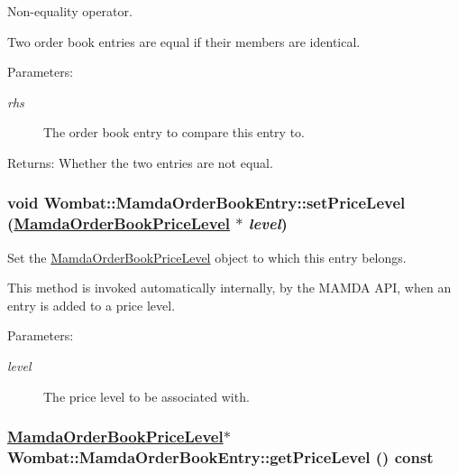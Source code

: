 Non-equality operator. 

Two order book entries are equal if their members are identical.

\begin{Desc}
\item[Parameters:]
\begin{description}
\item[{\em rhs}]The order book entry to compare this entry to.\end{description}
\end{Desc}
\begin{Desc}
\item[Returns:]Whether the two entries are not equal. \end{Desc}
\hypertarget{classWombat_1_1MamdaOrderBookEntry_8e9225992aec78b2bd455d0d14c8d257}{
\subsubsection[setPriceLevel]{\setlength{\rightskip}{0pt plus 5cm}void Wombat::Mamda\-Order\-Book\-Entry::set\-Price\-Level (\hyperlink{classWombat_1_1MamdaOrderBookPriceLevel}{Mamda\-Order\-Book\-Price\-Level} $\ast$ {\em level})}}
\label{classWombat_1_1MamdaOrderBookEntry_8e9225992aec78b2bd455d0d14c8d257}


Set the \hyperlink{classWombat_1_1MamdaOrderBookPriceLevel}{Mamda\-Order\-Book\-Price\-Level} object to which this entry belongs. 

This method is invoked automatically internally, by the MAMDA API, when an entry is added to a price level.

\begin{Desc}
\item[Parameters:]
\begin{description}
\item[{\em level}]The price level to be associated with. \end{description}
\end{Desc}
\hypertarget{classWombat_1_1MamdaOrderBookEntry_f150c5dddafcd155d418db41239d2f7c}{
\subsubsection[getPriceLevel]{\setlength{\rightskip}{0pt plus 5cm}\hyperlink{classWombat_1_1MamdaOrderBookPriceLevel}{Mamda\-Order\-Book\-Price\-Level}$\ast$ Wombat::Mamda\-Order\-Book\-Entry::get\-Price\-Level () const}}
\label{classWombat_1_1MamdaOrderBookEntry_f150c5dddafcd155d418db41239d2f7c}


